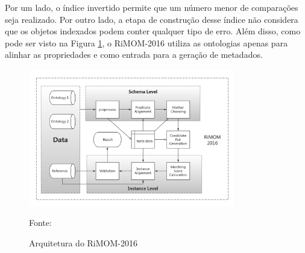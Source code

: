 Por um lado, o índice invertido permite que um número menor de comparações seja realizado. Por outro lado, a etapa de construção desse índice não considera que os objetos indexados podem conter qualquer tipo de erro. Além disso, como pode ser visto na Figura \ref{fig:rimom}, o RiMOM-2016 utiliza as ontologias apenas para alinhar as propriedades e como entrada para a geração de metadados.

\begin{figure}[!ht]
	\centering
	\includegraphics[width=0.8\textwidth]{./imagens/RiMOM_2016.png}
    \caption{Arquitetura do RiMOM-2016}
	\footnotesize{Fonte: \cite{zhang2016rimom}}
	\label{fig:rimom}
\end{figure}




